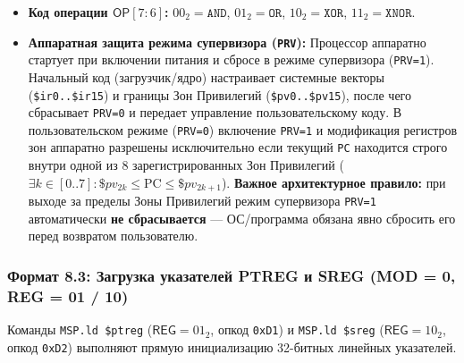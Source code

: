 \documentclass[11pt,a4paper]{article}
\newcommand{\reg}[1]{\texttt{#1}}
\newcommand{\field}[1]{\textsf{#1}}
\begin{document}
\begin{itemize}
  \item \textbf{Код операции $\field{OP} [7:6]$:} $00_2 = \texttt{AND}$, $01_2 = \texttt{OR}$, $10_2 = \texttt{XOR}$, $11_2 = \texttt{XNOR}$.
  \item \textbf{Аппаратная защита режима супервизора (\texttt{PRV}):} Процессор аппаратно стартует при включении питания и сбросе в режиме супервизора (\texttt{PRV=1}). Начальный код (загрузчик/ядро) настраивает системные векторы (\texttt{\$ir0..\$ir15}) и границы Зон Привилегий (\texttt{\$pv0..\$pv15}), после чего сбрасывает \texttt{PRV=0} и передает управление пользовательскому коду. В пользовательском режиме (\texttt{PRV=0}) включение \texttt{PRV=1} и модификация регистров зон аппаратно разрешены исключительно если текущий \reg{PC} находится строго внутри одной из 8 зарегистрированных Зон Привилегий ($\exists k \in [0..7]: \$pv_{2k} \le \text{PC} \le \$pv_{2k+1}$). \textbf{Важное архитектурное правило:} при выходе за пределы Зоны Привилегий режим супервизора \texttt{PRV=1} автоматически \textbf{не сбрасывается} --- ОС/программа обязана явно сбросить его перед возвратом пользователю.
\end{itemize}

\subsubsection{Формат 8.3: Загрузка указателей PTREG и SREG (MOD = 0, REG = 01 / 10)}
Команды \texttt{MSP.ld \$ptreg} ($\field{REG}=01_2$, опкод \texttt{0xD1}) и \texttt{MSP.ld \$sreg} ($\field{REG}=10_2$, опкод \texttt{0xD2}) выполняют прямую инициализацию 32-битных линейных указателей.
\end{document}
